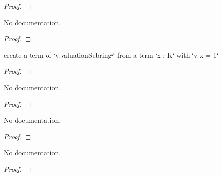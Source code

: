 \begin{proof}
    \leanok
\end{proof}

\begin{theorem}\label{isUnit_in_valuationSubring_of_val_eq_one}
        \leanok
                No documentation.
    \end{theorem}

\begin{proof}
    \leanok
\end{proof}

\begin{theorem}\label{unitOfValOne_elem}
        \leanok
                create a term of `v.valuationSubringˣ` from a term `x : K` with `v x = 1`
    \end{theorem}

\begin{proof}
    \leanok
\end{proof}

\begin{theorem}\label{val_unitOfValOne_eq_one}
        \leanok
                No documentation.
    \end{theorem}

\begin{proof}
    \leanok
\end{proof}

\begin{theorem}\label{pow_Uniformizer_all}
        \leanok
                No documentation.
    \end{theorem}

\begin{proof}
    \leanok
\end{proof}

\begin{theorem}\label{pow_Uniformizer'}
        \leanok
                No documentation.
    \end{theorem}

\begin{proof}
    \leanok
\end{proof}

